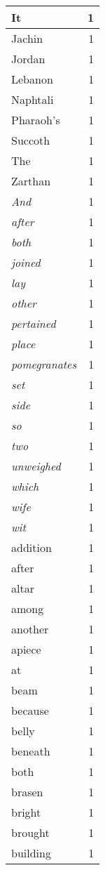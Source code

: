 \begin{center}
\begin{longtable}{l|r}
It & 1 \\ \hline
Jachin & 1 \\ \hline
Jordan & 1 \\ \hline
Lebanon & 1 \\ \hline
Naphtali & 1 \\ \hline
Pharaoh's & 1 \\ \hline
Succoth & 1 \\ \hline
The & 1 \\ \hline
Zarthan & 1 \\ \hline
\emph{And} & 1 \\ \hline
\emph{after} & 1 \\ \hline
\emph{both} & 1 \\ \hline
\emph{joined} & 1 \\ \hline
\emph{lay} & 1 \\ \hline
\emph{other} & 1 \\ \hline
\emph{pertained} & 1 \\ \hline
\emph{place} & 1 \\ \hline
\emph{pomegranates} & 1 \\ \hline
\emph{set} & 1 \\ \hline
\emph{side} & 1 \\ \hline
\emph{so} & 1 \\ \hline
\emph{two} & 1 \\ \hline
\emph{unweighed} & 1 \\ \hline
\emph{which} & 1 \\ \hline
\emph{wife} & 1 \\ \hline
\emph{wit} & 1 \\ \hline
addition & 1 \\ \hline
after & 1 \\ \hline
altar & 1 \\ \hline
among & 1 \\ \hline
another & 1 \\ \hline
apiece & 1 \\ \hline
at & 1 \\ \hline
beam & 1 \\ \hline
because & 1 \\ \hline
belly & 1 \\ \hline
beneath & 1 \\ \hline
both & 1 \\ \hline
brasen & 1 \\ \hline
bright & 1 \\ \hline
brought & 1 \\ \hline
building & 1 \\ \hline

\end{longtable}
\end{center}
